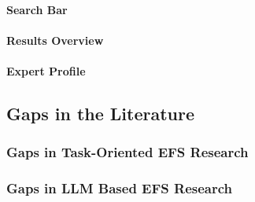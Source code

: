 \paragraph{Search Bar}
\paragraph{Results Overview}
\paragraph{Expert Profile}



\subsection{Gaps in the Literature}


\subsubsection{Gaps in Task-Oriented \acl{EFS} Research}
\subsubsection{Gaps in \acl{LLM} Based EFS Research}


